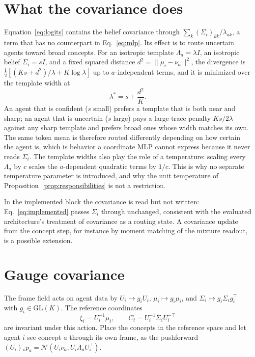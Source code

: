 \documentclass[11pt]{article}
\theoremstyle{definition}
\theoremstyle{remark}
\newcommand{\N}{\mathcal{N}}
\begin{document}
\section{What the covariance does}

Equation~\eqref{eq:logits} contains the belief covariance through $\sum_k(\Sigma_i)_{kk}/\lambda_{ak}$, a term that has no counterpart in Eq.~\eqref{eq:mlp}. Its effect is to route uncertain agents toward broad concepts. For an isotropic template $\Lambda_a=\lambda I$, an isotropic belief $\Sigma_i=sI$, and a fixed squared distance $d^2=\|\mu_i-\nu_a\|^2$, the divergence is $\frac12[(Ks+d^2)/\lambda+K\log\lambda]$ up to $a$-independent terms, and it is minimized over the template width at
\begin{equation}
\lambda^{*}=s+\frac{d^2}{K}.
\end{equation}
An agent that is confident ($s$ small) prefers a template that is both near and sharp; an agent that is uncertain ($s$ large) pays a large trace penalty $Ks/2\lambda$ against any sharp template and prefers broad ones whose width matches its own. The same token mean is therefore routed differently depending on how certain the agent is, which is behavior a coordinate MLP cannot express because it never reads $\Sigma_i$. The template widths also play the role of a temperature: scaling every $\Lambda_a$ by $c$ scales the $a$-dependent quadratic terms by $1/c$. This is why no separate temperature parameter is introduced, and why the unit temperature of Proposition~\ref{prop:responsibilities} is not a restriction.

In the implemented block the covariance is read but not written: Eq.~\eqref{eq:implemented} passes $\Sigma_i$ through unchanged, consistent with the evaluated architecture's treatment of covariance as a routing state. A covariance update from the concept step, for instance by moment matching of the mixture readout, is a possible extension.

\section{Gauge covariance}

The frame field acts on agent data by $U_i\mapsto g_iU_i$, $\mu_i\mapsto g_i\mu_i$, and $\Sigma_i\mapsto g_i\Sigma_ig_i^{\top}$ with $g_i\in\mathrm{GL}(K)$. The reference coordinates
\begin{equation}
\xi_i=U_i^{-1}\mu_i,
\qquad
C_i=U_i^{-1}\Sigma_iU_i^{-\top}
\end{equation}
are invariant under this action. Place the concepts in the reference space and let agent $i$ see concept $a$ through its own frame, as the pushforward $(U_i)_*p_a=\N(U_i\nu_a,U_i\Lambda_aU_i^{\top})$.
\end{document}

